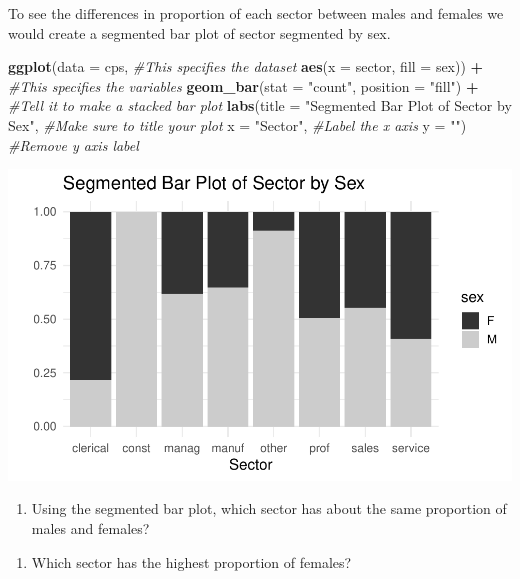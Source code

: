 \documentclass[
]{report}
\newenvironment{Shaded}{\begin{snugshade}}{\end{snugshade}}
\newcommand{\CommentTok}[1]{\textcolor[rgb]{0.56,0.35,0.01}{\textit{#1}}}
\newcommand{\DataTypeTok}[1]{\textcolor[rgb]{0.13,0.29,0.53}{#1}}
\newcommand{\KeywordTok}[1]{\textcolor[rgb]{0.13,0.29,0.53}{\textbf{#1}}}
\newcommand{\NormalTok}[1]{#1}
\newcommand{\OperatorTok}[1]{\textcolor[rgb]{0.81,0.36,0.00}{\textbf{#1}}}
\newcommand{\StringTok}[1]{\textcolor[rgb]{0.31,0.60,0.02}{#1}}
\providecommand{\tightlist}{%
  \setlength{\itemsep}{0pt}\setlength{\parskip}{0pt}}
\begin{document}
To see the differences in proportion of each sector between males and females we would create a segmented bar plot of sector segmented by sex.

\begin{Shaded}
\begin{Highlighting}[]
\KeywordTok{ggplot}\NormalTok{(}\DataTypeTok{data =}\NormalTok{ cps,   }\CommentTok{\#This specifies the dataset}
       \KeywordTok{aes}\NormalTok{(}\DataTypeTok{x =}\NormalTok{ sector, }\DataTypeTok{fill =}\NormalTok{ sex)) }\OperatorTok{+}\StringTok{   }\CommentTok{\#This specifies the variables}
\StringTok{  }\KeywordTok{geom\_bar}\NormalTok{(}\DataTypeTok{stat =} \StringTok{"count"}\NormalTok{, }\DataTypeTok{position =} \StringTok{"fill"}\NormalTok{) }\OperatorTok{+}\StringTok{  }\CommentTok{\#Tell it to make a stacked bar plot}
\StringTok{  }\KeywordTok{labs}\NormalTok{(}\DataTypeTok{title =} \StringTok{"Segmented Bar Plot of Sector by Sex"}\NormalTok{,  }\CommentTok{\#Make sure to title your plot }
       \DataTypeTok{x =} \StringTok{"Sector"}\NormalTok{,   }\CommentTok{\#Label the x axis}
       \DataTypeTok{y =} \StringTok{""}\NormalTok{)  }\CommentTok{\#Remove y axis label}
\end{Highlighting}
\end{Shaded}

\begin{center}\includegraphics[width=0.6\linewidth]{03-EDA-categorical_files/figure-latex/unnamed-chunk-5-1} \end{center}

\begin{enumerate}
\def\labelenumi{\arabic{enumi}.}
\setcounter{enumi}{5}
\tightlist
\item
  Using the segmented bar plot, which sector has about the same proportion of males and females?
\end{enumerate}

\vspace{0.5in}

\begin{enumerate}
\def\labelenumi{\arabic{enumi}.}
\setcounter{enumi}{6}
\tightlist
\item
  Which sector has the highest proportion of females?
\end{enumerate}
\end{document}
